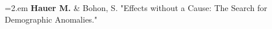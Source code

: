        \hangindent=2.em \textbf{Hauer M.} \& Bohon, S. "Effects without a Cause: The Search for Demographic Anomalies."\\

%
%









